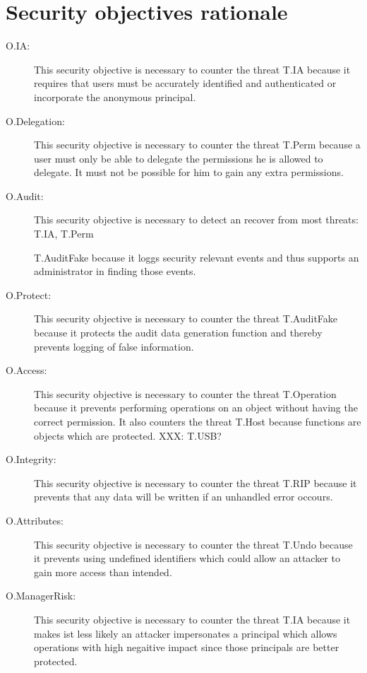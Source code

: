\documentclass[12pt,english]{scrbook}
\begin{document}




\section{Security objectives rationale}

\begin{description}
  
  \item[O.IA:] This security objective is necessary to counter the threat T.IA
  because it requires that users must be accurately identified and
  authenticated or incorporate the anonymous principal.


  \item[O.Delegation:] This security objective is necessary to counter the
  threat T.Perm because a user must only be able to delegate the permissions
  he is allowed to delegate. It must not be possible for him to gain any extra
  permissions.
  
  \item[O.Audit:] This security objective is necessary to detect an recover
  from most threats: T.IA, T.Perm

  
  T.AuditFake because it loggs security relevant events and thus supports an
  administrator in finding those events.

  \item[O.Protect:] This security objective is necessary to counter the threat
  T.AuditFake because it protects the audit data generation function and
  thereby prevents logging of false information.
  
  \item[O.Access:] This security objective is necessary to counter the threat
  T.Operation because it prevents performing operations on an object without
  having the correct permission. It also counters the threat T.Host because
  functions are objects which are protected.  XXX: T.USB?

  \item[O.Integrity:] This security objective is necessary to counter the
  threat T.RIP because it prevents that any data will be written if an 
  unhandled error occours.
  
  \item[O.Attributes:] This security objective is necessary to counter the
  threat T.Undo because it prevents using undefined identifiers which could
  allow an attacker to gain more access than intended.

  \item[O.ManagerRisk:] This security objective is necessary to counter the
  threat T.IA because it makes ist less likely an attacker impersonates a
  principal which allows operations with high negaitive impact since those
  principals are better protected.


  
\end{description}
\end{document}

